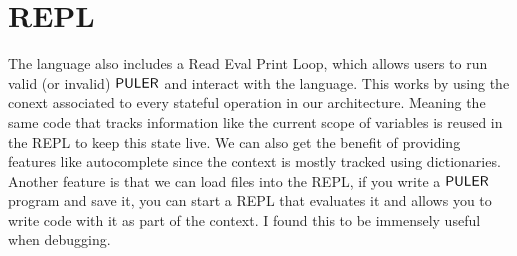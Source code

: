 \section{REPL}\label{REPL}
    The language also includes a Read Eval Print Loop, which allows users to run valid (or invalid) $\mathsf{PULER}$ and interact with the language. This works by using the conext associated to every stateful operation in our architecture. Meaning the same code that tracks information like the current scope of variables is reused in the REPL to keep this state live. We can also get the benefit of providing features like autocomplete since the context is mostly tracked using dictionaries. Another feature is that we can load files into the REPL, if you write a $\mathsf{PULER}$ program and save it, you can start a REPL that evaluates it and allows you to write code with it as part of the context. I found this to be immensely useful when debugging.
